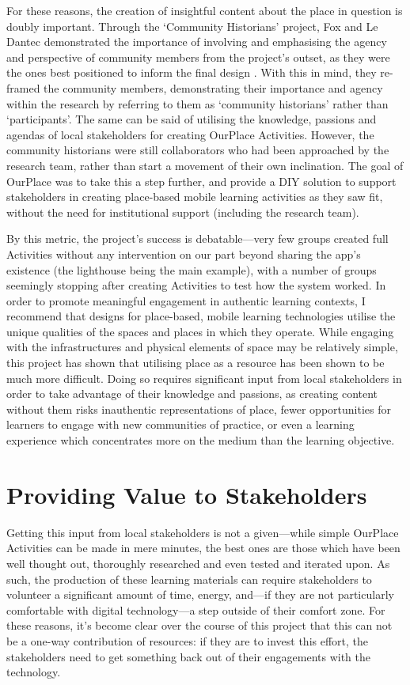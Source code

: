 For these reasons, the creation of insightful content about the place in question is doubly important. Through the `Community Historians' project, Fox and Le Dantec demonstrated the importance of involving and emphasising the agency and perspective of community members from the project's outset, as they were the ones best positioned to inform the final design \citep{Fox2014}. With this in mind, they re-framed the community members, demonstrating their importance and agency within the research by referring to them as `community historians' rather than `participants'. The same can be said of utilising the knowledge, passions and agendas of local stakeholders for creating OurPlace Activities. However, the community historians were still collaborators who had been approached by the research team, rather than start a movement of their own inclination. The goal of OurPlace was to take this a step further, and provide a DIY solution to support stakeholders in creating place-based mobile learning activities as they saw fit, without the need for institutional support (including the research team).

By this metric, the project's success is debatable---very few groups created full Activities without any intervention on our part beyond sharing the app's existence (the lighthouse being the main example), with a number of groups seemingly stopping after creating Activities to test how the system worked. In order to promote meaningful engagement in authentic learning contexts, I recommend that designs for place-based, mobile learning technologies utilise the unique qualities of the spaces and places in which they operate. While engaging with the infrastructures and physical elements of space may be relatively simple, this project has shown that utilising place as a resource has been shown to be much more difficult. Doing so requires significant input from local stakeholders in order to take advantage of their knowledge and passions, as creating content without them risks inauthentic representations of place, fewer opportunities for learners to engage with new communities of practice, or even a learning experience which concentrates more on the medium than the learning objective. 

\section{Providing Value to Stakeholders}

Getting this input from local stakeholders is not a given---while simple OurPlace Activities can be made in mere minutes, the best ones are those which have been well thought out, thoroughly researched and even tested and iterated upon. As such, the production of these learning materials can require stakeholders to volunteer a significant amount of time, energy, and---if they are not particularly comfortable with digital technology---a step outside of their comfort zone. For these reasons, it's become clear over the course of this project that this can not be a one-way contribution of resources: if they are to invest this effort, the stakeholders need to get something back out of their engagements with the technology.

